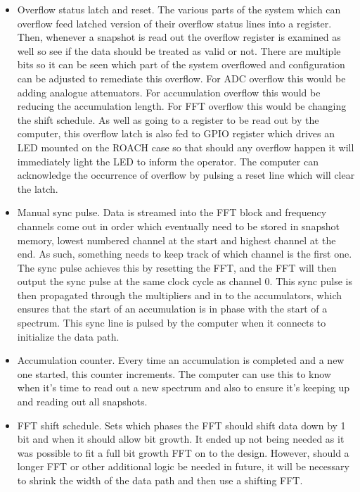 \begin{itemize}
  \item Overflow status latch and reset. The various parts of the system which can overflow feed latched version of their overflow status lines into a register. Then, whenever a snapshot is read out the overflow register is examined as well so see if the data should be treated as valid or not. There are multiple bits so it can be seen which part of the system overflowed and configuration can be adjusted to remediate this overflow. For ADC overflow this would be adding analogue attenuators. For accumulation overflow this would be reducing the accumulation length. For FFT overflow this would be changing the shift schedule. As well as going to a register to be read out by the computer, this overflow latch is also fed to GPIO register which drives an LED mounted on the ROACH case so that should any overflow happen it will immediately light the LED to inform the operator. The computer can acknowledge the occurrence of overflow by pulsing a reset line which will clear the latch.
  \item Manual sync pulse. Data is streamed into the FFT block and frequency channels come out in order which eventually need to be stored in snapshot memory, lowest numbered channel at the start and highest channel at the end. As such, something needs to keep track of which channel is the first one. The sync pulse achieves this by resetting the FFT, and the FFT will then output the sync pulse at the same clock cycle as channel 0. This sync pulse is then propagated through the multipliers and in to the accumulators, which ensures that the start of an accumulation is in phase with the start of a spectrum. This sync line is pulsed by the computer when it connects to initialize the data path.
  \item Accumulation counter. Every time an accumulation is completed and a new one started, this counter increments. The computer can use this to know when it's time to read out a new spectrum and also to ensure it's keeping up and reading out all snapshots.
  \item FFT shift schedule. Sets which phases the FFT should shift data down by 1 bit and when it should allow bit growth. It ended up not being needed as it was possible to fit a full bit growth FFT on to the design. However, should a longer FFT or other additional logic be needed in future, it will be necessary to shrink the width of the data path and then use a shifting FFT.
\end{itemize}

